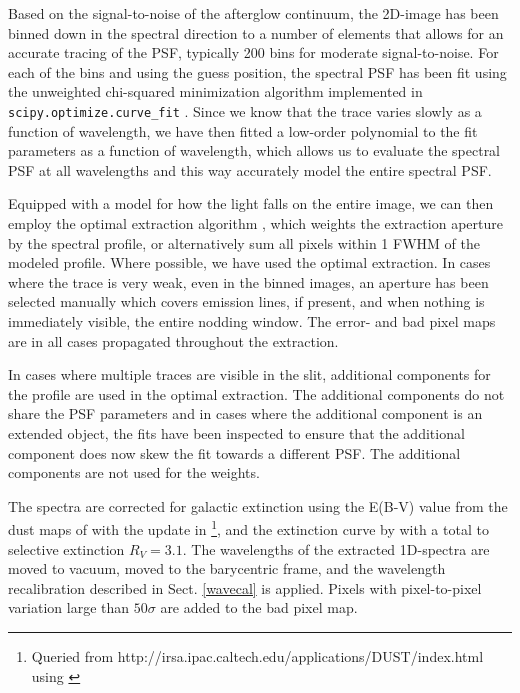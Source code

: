 \documentclass{aa}    %
\begin{document}
Based on the signal-to-noise of the afterglow continuum, the 2D-image has been
binned down in the spectral direction to a number of elements that allows for an
accurate tracing of the PSF, typically 200 bins for moderate signal-to-noise.
For each of the bins and using the guess position, the spectral PSF has been fit
using the unweighted chi-squared minimization algorithm implemented in
\texttt{scipy.optimize.curve\_fit} \citep{scipy}. Since we know that the trace
varies slowly as a function of wavelength, we have then fitted a low-order
polynomial to the fit parameters as a function of wavelength, which allows us to
evaluate the spectral PSF at all wavelengths and this way accurately model the
entire spectral PSF.

Equipped with a model for how the light falls on the entire image, we can then
employ the optimal extraction algorithm \cite{Horne1986}, which weights the
extraction aperture by the spectral profile, or alternatively sum all pixels
within 1 FWHM of the modeled profile. Where possible, we have used the optimal
extraction. In cases where the trace is very weak, even in the binned images, an
aperture has been selected manually which covers emission lines, if present, and
when nothing is immediately visible, the entire nodding window. The error- and
bad pixel maps are in all cases propagated throughout the extraction.

In cases where multiple traces are visible in the slit, additional components
for the profile are used in the optimal extraction. The additional components
do not share the PSF parameters and in cases where the additional component is an
extended object, the fits have been inspected to ensure that the additional
component does now skew the fit towards a different PSF. The additional
components are not used for the weights.

The spectra are corrected for galactic extinction using the E(B-V) value from
the dust maps of \citet{Schlegel1998} with the update in
\citet{Schlafly2011}\footnote{Queried from
	http://irsa.ipac.caltech.edu/applications/DUST/index.html using
	\citet{astroquery}}, and the extinction curve by \cite{Cardelli1989} with a
total to selective extinction $R_V = 3.1$. The wavelengths of the extracted
1D-spectra are moved to vacuum, moved to the barycentric frame, and the
wavelength recalibration described in Sect. \ref{wavecal} is applied. Pixels
with pixel-to-pixel variation large than $50 \sigma$ are added to the bad pixel
map.


\end{document}

